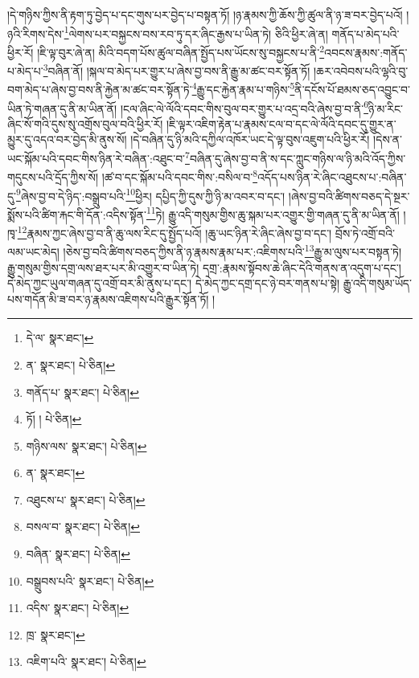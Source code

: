 །དེ་གཉིས་ཀྱིས་ནི་རྟག་ཏུ་བྱེད་པ་དང་གུས་པར་བྱེད་པ་བསྟན་ཏོ། །ཉ་རྣམས་ཀྱི་ཆོས་ཀྱི་ཚུལ་ནི་ཉ་ཟ་བར་བྱེད་པའོ། །ཉའི་རིགས་དེས་\footnote{དེ་ལ་  སྣར་ཐང་། }ལེགས་པར་བསྐྱངས་བས་རབ་ཏུ་དར་ཞིང་རྒྱས་པ་ཡིན་ཏེ། ཅིའི་ཕྱིར་ཞེ་ན། གནོད་པ་མེད་པའི་ཕྱིར་རོ། །ཇི་ལྟ་བུར་ཞེ་ན། མིའི་བདག་པོས་ཚུལ་བཞིན་སྤྱོད་པས་ཡོངས་སུ་བསྐྱངས་པ་ནི་\footnote{ན་  སྣར་ཐང་།  པེ་ཅིན། }འབངས་རྣམས་:གནོད་པ་མེད་པ་\footnote{གནོད་པ་  སྣར་ཐང་།  པེ་ཅིན། }བཞིན་ནོ། །སྐལ་བ་མེད་པར་གྱུར་པ་ཞེས་བྱ་བས་ནི་རྒྱུ་མ་ཚང་བར་སྟོན་ཏོ། །ཆར་འབེབས་པའི་ལྷའི་བུ་བག་མེད་པ་ཞེས་བྱ་བས་ནི་རྐྱེན་མ་ཚང་བར་སྟོན་ཏེ་\footnote{ཏོ། །  པེ་ཅིན། }རྒྱུ་དང་རྐྱེན་རྣམ་པ་གཉིས་\footnote{གཉིས་ལས་  སྣར་ཐང་།  པེ་ཅིན། }ནི་དངོས་པོ་ཐམས་ཅད་འབྱུང་བ་ཡིན་ཏེ་གཞན་དུ་ནི་མ་ཡིན་ནོ། །ངལ་ཞིང་ལེ་ལོའི་དབང་གིས་བུལ་བར་གྱུར་པ་འདྲ་བའི་ཞེས་བྱ་བ་ནི་\footnote{ན་  སྣར་ཐང་། }ཉི་མ་རིང་ཞིང་སོ་གའི་དུས་སུ་འགྲོས་བུལ་བའི་ཕྱིར་རོ། །ཇི་ལྟར་འཇིག་རྟེན་པ་རྣམས་ངལ་བ་དང་ལེ་ལོའི་དབང་དུ་གྱུར་ན་མྱུར་དུ་འདའ་བར་བྱེད་མི་ནུས་སོ། །དེ་བཞིན་དུ་ཉི་མའི་དཀྱིལ་འཁོར་ཡང་དེ་ལྟ་བུས་འཇུག་པའི་ཕྱིར་རོ། །དེས་ན་ཡང་སྐོམ་པའི་དབང་གིས་ཉིན་རེ་བཞིན་:འཐུང་བ་\footnote{འཐུངས་པ་  སྣར་ཐང་།  པེ་ཅིན། }བཞིན་དུ་ཞེས་བྱ་བ་ནི་ས་དང་ཀླུང་གཉིས་ལ་ཉི་མའི་འོད་ཀྱིས་གདུངས་པའི་དྲོད་ཀྱིས་སོ། །ཚ་བ་དང་སྐོམ་པའི་དབང་གིས་:བསིལ་བ་\footnote{བསལ་བ་  སྣར་ཐང་།  པེ་ཅིན། }འདོད་པས་ཉིན་རེ་ཞིང་འཐུངས་པ་:བཞིན་དུ་\footnote{བཞིན་  སྣར་ཐང་།  པེ་ཅིན། }ཞེས་བྱ་བ་དེ་ཉིད་:བསྒྲུབ་པའི་\footnote{བསྒྲུབས་པའི་  སྣར་ཐང་།  པེ་ཅིན། }ཕྱིར། དཔྱིད་ཀྱི་དུས་ཀྱི་ཉི་མ་འབར་བ་དང་། །ཞེས་བྱ་བའི་ཚིགས་བཅད་དེ་སྔར་སྨོས་པའི་ཚིག་རྐང་གི་དོན་:འདིས་སྟོན་\footnote{འདིས་  སྣར་ཐང་།  པེ་ཅིན། }ཏེ། རྒྱུ་འདི་གསུམ་གྱིས་ཆུ་སྐམ་པར་འགྱུར་གྱི་གཞན་དུ་ནི་མ་ཡིན་ནོ། །ཁྭ་\footnote{ཁྲ་  སྣར་ཐང་། }རྣམས་ཀྱང་ཞེས་བྱ་བ་ནི་ཆུ་ལས་རིང་དུ་སྤྱོད་པའོ། །ཆུ་ཡང་ཉིན་རེ་ཞིང་ཞེས་བྱ་བ་དང་། བྲོས་ཏེ་འགྲོ་བའི་ལམ་ཡང་མེད། །ཅེས་བྱ་བའི་ཚིགས་བཅད་ཀྱིས་ནི་ཉ་རྣམས་རྣམ་པར་:འཇིགས་པའི་\footnote{འཇིག་པའི་  སྣར་ཐང་།  པེ་ཅིན། }རྒྱུ་མ་ལུས་པར་བསྟན་ཏེ། རྒྱུ་གསུམ་གྱིས་དགྲ་ལས་ཐར་པར་མི་འགྱུར་བ་ཡིན་ཏེ། དགྲ་:རྣམས་སྟོབས་ཆེ་ཞིང་དེའི་གནས་ན་འདུག་པ་དང་། དེ་མེད་ཀྱང་ཡུལ་གཞན་དུ་འགྲོ་བར་མི་ནུས་པ་དང་། དེ་མེད་ཀྱང་དགྲ་དང་ཉེ་བར་གནས་པ་སྟེ། རྒྱུ་འདི་གསུམ་ཡོད་པས་གདོན་མི་ཟ་བར་ཉ་རྣམས་འཇིགས་པའི་རྒྱུར་སྟོན་ཏོ། །
